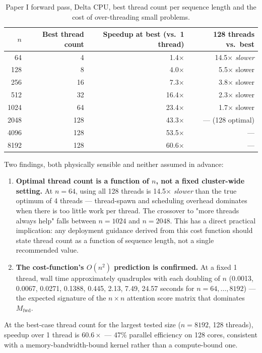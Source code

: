 \documentclass[11pt]{article}
\begin{document}
\begin{table}[htbp]
\centering
\begin{tabular}{rrrr}
\toprule
$n$ & Best thread count & Speedup at best (vs.\ 1 thread) & 128 threads vs.\ best \\
\midrule
64   & 4   & 1.4$\times$  & 14.5$\times$ \emph{slower} \\
128  & 8   & 4.0$\times$  & 5.5$\times$ slower \\
256  & 16  & 7.3$\times$  & 3.8$\times$ slower \\
512  & 32  & 16.4$\times$ & 2.3$\times$ slower \\
1024 & 64  & 23.4$\times$ & 1.7$\times$ slower \\
2048 & 128 & 43.3$\times$ & --- (128 optimal) \\
4096 & 128 & 53.5$\times$ & --- \\
8192 & 128 & 60.6$\times$ & --- \\
\bottomrule
\end{tabular}
\caption{Paper I forward pass, Delta CPU, best thread count per sequence
length and the cost of over-threading small problems.}
\label{tab:paper1-cpu}
\end{table}

Two findings, both physically sensible and neither assumed in advance:

\begin{enumerate}
\item \textbf{Optimal thread count is a function of $n$, not a fixed
cluster-wide setting.} At $n=64$, using all 128 threads is
14.5$\times$ \emph{slower} than the true optimum of 4 threads ---
thread-spawn and scheduling overhead dominates when there is too
little work per thread. The crossover to "more threads always help"
falls between $n=1024$ and $n=2048$. This has a direct practical
implication: any deployment guidance derived from this cost function
should state thread count as a function of sequence length, not a
single recommended value.
\item \textbf{The cost-function's $O(n^2)$ prediction is confirmed.} At
a fixed 1 thread, wall time approximately quadruples with each
doubling of $n$ (0.0013, 0.0067, 0.0271, 0.1388, 0.445, 2.13, 7.49,
24.57 seconds for $n = 64, \ldots, 8192$) --- the expected signature of
the $n \times n$ attention score matrix that dominates $M_{\mathrm{fwd}}$.
\end{enumerate}

At the best-case thread count for the largest tested size ($n=8192$,
128 threads), speedup over 1 thread is $60.6\times$ --- 47\% parallel
efficiency on 128 cores, consistent with a memory-bandwidth-bound
kernel rather than a compute-bound one.
\end{document}

